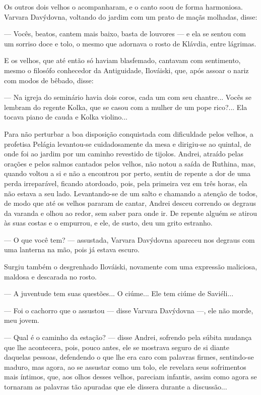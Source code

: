 Os outros dois velhos o acompanharam, e o canto soou de forma
harmoniosa. Varvara Davýdovna, voltando do jardim com um prato de maçãs
molhadas, disse:

--- Vocês, beatos, cantem mais baixo, basta de louvores --- e ela se
sentou com um sorriso doce e tolo, o mesmo que adornava o rosto de
Klávdia, entre lágrimas.

E os velhos, que até então só haviam blasfemado, cantavam com
sentimento, mesmo o filosófo conhecedor da Antiguidade, Ilováiski, que,
após assoar o nariz com modos de bêbado, disse:

--- Na igreja do seminário havia dois coros, cada um com seu chantre...
Vocês se lembram do regente Kolka, que se casou com a mulher de um pope
rico?... Ela tocava piano de cauda e Kolka violino...

Para não perturbar a boa disposição conquistada com dificuldade pelos
velhos, a profetisa Pelágia levantou-se cuidadosamente da mesa e
dirigiu-se ao quintal, de onde foi ao jardim por um caminho revestido de
tijolos. Andrei, atraído pelas orações e pelos salmos cantados pelos
velhos, não notou a saída de Ruthina, mas, quando voltou a si e não a
encontrou por perto, sentiu de repente a dor de uma perda irreparável,
ficando atordoado, pois, pela primeira vez em três horas, ela não estava
a seu lado. Levantando-se de um salto e chamando a atenção de todos, de
modo que até os velhos pararam de cantar, Andrei desceu correndo os
degraus da varanda e olhou ao redor, sem saber para onde ir. De repente
alguém se atirou às suas costas e o empurrou, e ele, de susto, deu um
grito estranho.

--- O que você tem? --- assustada, Varvara Davýdovna apareceu nos
degraus com uma lanterna na mão, pois já estava escuro.

Surgiu também o desgrenhado Ilováiski, novamente com uma expressão
maliciosa, maldosa e descarada no rosto.

--- A juventude tem suas questões... O ciúme... Ele tem ciúme de
Saviéli...

--- Foi o cachorro que o assustou --- disse Varvara Davýdovna ---, ele
não morde, meu jovem.

--- Qual é o caminho da estação? --- disse Andrei, sofrendo pela súbita
mudança que lhe acontecera, pois, pouco antes, ele se mostrava seguro de
si diante daquelas pessoas, defendendo o que lhe era caro com palavras
firmes, sentindo-se maduro, mas agora, ao se assustar como um tolo, ele
revelara seus sofrimentos mais íntimos, que, aos olhos desses velhos,
pareciam infantis, assim como agora se tornaram as palavras tão apuradas
que ele dissera durante a discussão...

